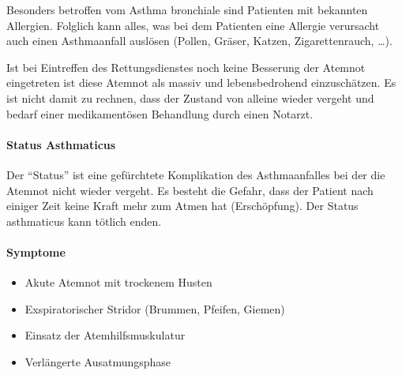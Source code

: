 
Besonders betroffen vom Asthma bronchiale sind Patienten
mit bekannten Allergien. Folglich kann alles, was bei dem
Patienten eine Allergie verursacht auch einen Asthmaanfall
auslösen (Pollen, Gräser, Katzen, Zigarettenrauch, \ldots). 

Ist bei Eintreffen des Rettungsdienstes noch keine
Besserung der Atemnot eingetreten ist diese Atemnot als
massiv und lebensbedrohend einzuschätzen. Es ist nicht
damit zu rechnen, dass der Zustand von alleine wieder
vergeht und bedarf einer medikamentösen Behandlung durch einen
Notarzt. 


\paragraph{Status Asthmaticus}
\label{topic:status-asthmaticus}Der
"`Status"' ist eine gefürchtete Komplikation des
Asthmaanfalles bei der die Atemnot nicht wieder vergeht. Es
besteht die Gefahr, dass der Patient nach einiger Zeit keine
Kraft mehr zum Atmen hat (Erschöpfung). Der Status
asthmaticus kann tötlich enden.




\paragraph{ Symptome}

\begin{itemize}
    \item Akute Atemnot mit trockenem Husten
    \item Exspiratorischer Stridor (Brummen, Pfeifen, Giemen)
    \item Einsatz der Atemhilfsmuskulatur
    \item Verlängerte Ausatmungsphase
\end{itemize}

